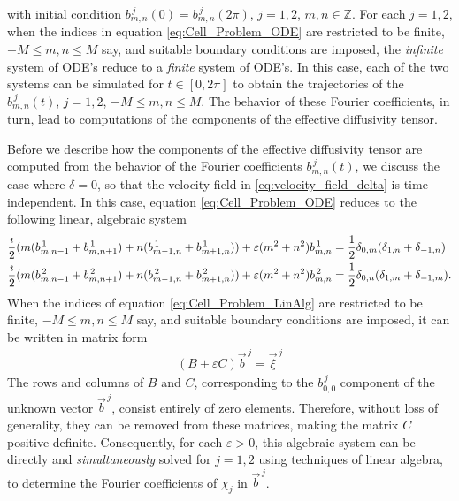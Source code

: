 \documentclass[11pt]{amsart}
\begin{document}
%
with  initial condition $b^{\,j}_{m,n}(0)=b^{\,j}_{m,n}(2\pi)$, $j=1,2$,
$m,n\in\mathbb{Z}$. For each $j=1,2$, when the indices in equation
\eqref{eq:Cell_Problem_ODE} are restricted to be finite, $-M\leq m,n\leq M$
say, and suitable boundary conditions are imposed, the \emph{infinite}
system of ODE's reduce to a \emph{finite} system of ODE's. In this
case, each of the two systems can be simulated for $t\in[0,2\pi]$ to obtain
the trajectories of the $b^{\,j}_{m,n}(t)$, $j=1,2$, $-M\leq m,n\leq M$. The
behavior of these Fourier coefficients, in turn, lead to computations
of the components of the effective diffusivity tensor.    






Before we describe how the components of the effective diffusivity
tensor are computed from the behavior of the Fourier coefficients
$b^{\,j}_{m,n}(t)$, we discuss the case where $\delta=0$, so that the
velocity field in \eqref{eq:velocity_field_delta} is
time-independent. In this case, equation  \eqref{eq:Cell_Problem_ODE}
reduces to the following linear, algebraic system 
%
\begin{align}\label{eq:Cell_Problem_LinAlg}
    \frac{\imath}{2}(m(b^{\,1}_{m,n-1}+b^{\,1}_{m,n+1})+n(b^{\,1}_{m-1,n}+b^{\,1}_{m+1,n}))      
    +\varepsilon(m^2+n^2)b^{\,1}_{m,n}
    &=\frac{1}{2}\delta_{0,m}(\delta_{1,n}+\delta_{-1,n})          
    \\
    \frac{\imath}{2}(m(b^{\,2}_{m,n-1}+b^{\,2}_{m,n+1})+n(b^{\,2}_{m-1,n}+b^{\,2}_{m+1,n}))    
    +\varepsilon(m^2+n^2)b^{\,2}_{m,n}    
    &=\frac{1}{2}\delta_{0,n}(\delta_{1,m}+\delta_{-1,m}).       
    \notag          
\end{align}
%
When the indices of equation \eqref{eq:Cell_Problem_LinAlg} are
restricted to be finite, $-M\leq m,n\leq M$ say, and suitable boundary
conditions are imposed, it can be written in matrix form  
%
\begin{align}
  (B+\varepsilon C)\vec{b}^{\,j}=\vec{\xi}^{\,j}
\end{align}
%
The rows and columns of $B$ and $C$, corresponding to the $b^{\,j}_{0,0}$
component of the unknown vector $\vec{b}^{\,j}$, consist entirely of zero
elements. Therefore, without loss of generality, they can be removed
from these matrices, making the matrix $C$
positive-definite. Consequently, for each $\varepsilon>0$, this algebraic system
can be directly and \emph{simultaneously} solved for $j=1,2$ using
techniques of linear algebra, to determine the Fourier coefficients of
$\chi_j$ in $\vec{b}^{\,j}$.    
\end{document}
